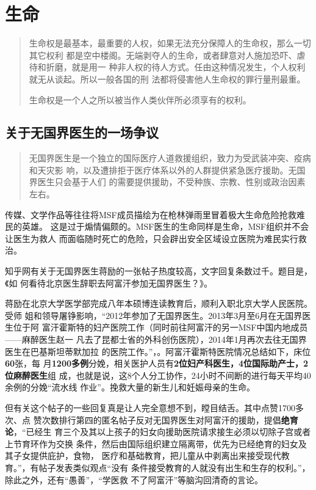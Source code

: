 \chapter{生命}

\begin{quotation}
  生命权是最基本，最重要的人权，如果无法充分保障人的生命权，那么一切其它权利
  都是空中楼阁。无端剥夺人的生命，或者肆意对人施加恐吓、虐待和折磨，就是用一
  种非人权的待人方式。任由这种情况发生，个人权利就无从谈起。所以一般各国的刑
  法都将侵害他人生命权的罪行量刑最重。

  生命权是一个人之所以被当作人类伙伴所必须享有的权利。\cite{renquanwiki}
\end{quotation}

\section{关于无国界医生的一场争议}

\begin{quotation}
  无国界医生是一个独立的国际医疗人道救援组织，致力为受武装冲突、疫病和天灾影
  响，以及遭排拒于医疗体系以外的人群提供紧急医疗援助。无国界医生只会基于人们
  的需要提供援助，不受种族、宗教、性别或政治因素左右。
\end{quotation}

传媒、文学作品等往往将MSF成员描绘为在枪林弹雨里冒着极大生命危险抢救难民的英雄。
这是过于煽情偏颇的。MSF医生的生命同样是生命，MSF组织并不会让医生为救人
而面临随时死亡的危险，只会辟出安全区域设立医院为难民实行救治。

知乎网有关于无国界医生蒋励的一张帖子热度较高，文字回复条数过千。题目是，《如
何看待北京医生辞职去阿富汗参加无国界医生？》。\cite{kandaijiangli}

蒋励在北京大学医学部完成八年本硕博连读教育后，顺利入职北京大学人民医院。受师
姐和领导屠铮影响，“2012年参加了无国界医生。2013年3月至6月在无国界医生位于阿
富汗霍斯特的妇产医院工作（同时前往阿富汗的另一MSF中国内地成员——麻醉医生赵一
凡去了昆都士省的外科创伤医院），2014年1月再次去往无国界医生在巴基斯坦蒂默加拉
的医院工作。”，\cite{jiangli}。阿富汗霍斯特医院情况总结如下，床位\textbf{60}张，每
月\textbf{1200多例}分娩，相关医护人员有\textbf{2位妇产科医生，4位国际助产士，2位麻醉医生}组
成，也就是说，这8个人分工协作，24小时不间断的进行每天平均40余例的分娩“流水线
作业”。挽救大量的新生儿和妊娠母亲的生命。

但有关这个帖子的一些回复真是让人完全意想不到，瞠目结舌。其中点赞1700多次、点
赞次数排行第四的匿名帖子反对无国界医生对阿富汗的援助，提倡\textbf{绝育论}，“已经生
育三个及其以上孩子的妇女向援助医院请求接生必须以切除子宫或者上节育环作为交换
条件，然后由国际组织建立隔离带，优先为已经绝育的妇女及其子女提供庇护，食物，
医疗和基础教育，把儿童从中剥离出来接受现代教育。”，有帖子发表类似观点“没有
条件接受教育的人就没有出生和生存的权利。”，除此之外，还有“愚善”，“学医救
不了阿富汗”等脑沟回清奇的言论。

